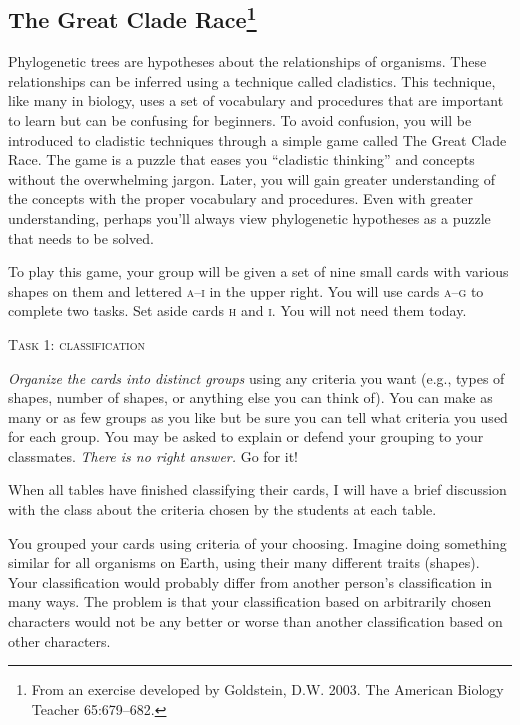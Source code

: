 \documentclass[12pt, hidelinks]{exam}
\begin{document}
\subsection*{The Great Clade Race\footnote{From an exercise developed by Goldstein, D.W. 2003. The American Biology Teacher 65:679--682.}}

Phylogenetic trees are hypotheses about the relationships of organisms. These relationships can be inferred using a technique called cladistics. This technique, like many in biology, uses a set of vocabulary and procedures that are important to learn but can be confusing for beginners. To avoid confusion, you will be introduced to cladistic techniques through a simple game called The Great Clade Race. The game is a puzzle that eases you “cladistic thinking” and concepts without the overwhelming jargon. Later, you will gain greater understanding of the concepts with the proper vocabulary and procedures. Even with greater understanding, perhaps you'll always view phylogenetic hypotheses as a puzzle that needs to be solved.

To play this game, your group will be given a set of nine small cards with various shapes on them and lettered \textsc{a}–\textsc{i} in the upper right. You will use cards \textsc{a--g} to complete two tasks. Set aside cards \textsc{h} and \textsc{i}. You will not need them today. \vspace*{2\baselineskip}

\noindent\textsc{Task 1: classification}

\textit{Organize the cards into distinct groups} using any criteria you want (e.g., types of shapes, number of shapes, or anything else you can think of). You can make as many or as few groups as you like but be sure you can tell what criteria you used for each group. You may be asked to explain or defend your grouping to your classmates. \emph{There is no right answer.} Go for it!

When all tables have finished classifying their cards, I will have a brief discussion with the class about the criteria chosen by the students at each table.\vspace*{1\baselineskip}

You grouped your cards using criteria of your choosing. Imagine doing something similar for all organisms on Earth, using their many different traits (shapes). Your classification would probably differ from another person's classification in many ways. The problem is that your classification based on arbitrarily chosen characters would not be any better or worse than another classification based on other characters.
\end{document}
